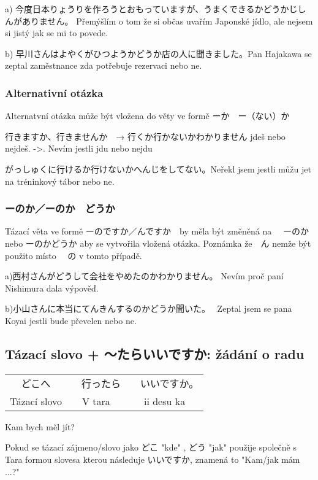 a) 今度日本りょうりを作ろうとおもっていますが、うまくできるかどうかじしんがありません。
Přemýšlím o tom že si občas uvařím Japonské jídlo, ale nejsem si jistý jak se mi to povede.

b) 早川さんはよやくがひつようかどうか店の人に聞きました。Pan Hajakawa se zeptal zaměstnance zda potřebuje rezervaci nebo ne.

\subsubsection{Alternativní otázka}

Alternatvní otázka může být vložena do věty ve formě  ーか　ー（ない）か

行きますか、行きませんか　→    行くか行かないかわかりません
jdeš nebo nejdeš.          ->.        Nevím jestli jdu nebo nejdu


がっしゅくに行けるか行けないかへんじをしてない。Neřekl jsem jestli můžu jet na tréninkový tábor nebo ne.


\subsubsection{ーのか／ーのか　どうか}
Tázací věta ve formě ーのですか／んですか　by měla být změněná na 　ーのか　nebo ーのかどうか aby se vytvořila vložená otázka. Poznámka že　ん nemže být použito místo 　の v tomto případě.


a)西村さんがどうして会社をやめたのかわかりません。 Nevím proč paní Nishimura dala výpověď.

b)小山さんに本当にてんきんするのかどうか聞いた。　 Zeptal jsem se pana Koyai jestli bude převelen nebo ne.


\subsection{Tázací slovo + 〜たらいいですか: žádání o radu}

\begin{center}
\begin{tabular}{|| c || c | c ||}
どこへ　&　行ったら&　いいですか。\\
Tázací slovo &V tara&ii desu ka\\ 
\end{tabular}
\end{center}
Kam bych měl jít?

Pokud se tázací zájmeno/slovo jako どこ "kde" , どう "jak" použije společně s Tara formou slovesa kterou následuje いいですか, znamená to "Kam/jak mám ...?"

